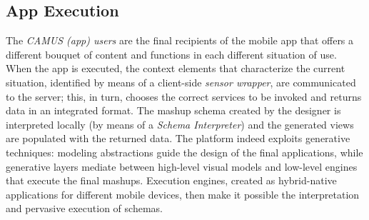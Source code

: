 
\subsection{App Execution}
The \emph{CAMUS (app) users} are the final recipients of the mobile
app that offers a different bouquet of content and functions in each
different situation of use. When the app is executed, the context
elements that characterize the current situation, identified
by means of a client-side \emph{sensor wrapper}, are communicated to
the server; this, in turn, chooses the correct services to be invoked and returns
data in an integrated format. The mashup schema created by the designer is
interpreted {locally} (by means of a \emph{Schema Interpreter}) and the
generated views are populated with the returned data.
The platform indeed exploits generative techniques: modeling abstractions guide the
design of the final applications, while generative layers mediate
between high-level visual models and low-level engines that
execute the final mashups. Execution engines, created as {hybrid-native}
applications for different mobile devices, then make it possible the
interpretation and pervasive execution of schemas.


